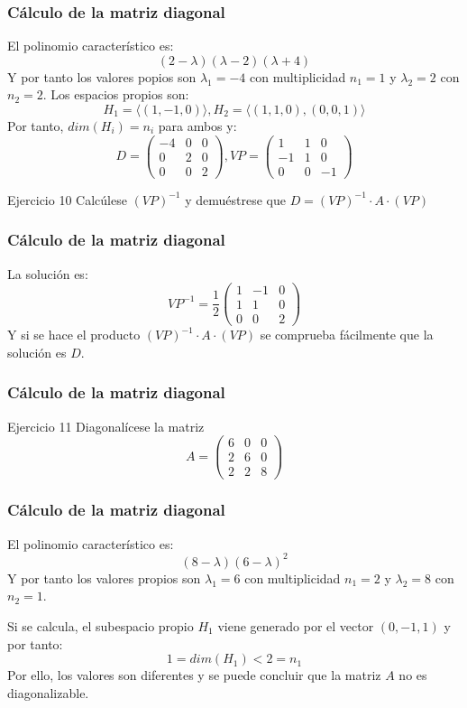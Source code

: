 \documentclass{beamer}
\begin{document}
\begin{frame}
\frametitle{C\'alculo de la matriz diagonal}
El polinomio caracter\'istico es:
\[(2-\lambda)(\lambda-2)(\lambda+4)\]
Y por tanto los valores popios son $\lambda_1 = -4$ con multiplicidad $n_1=1$ y $\lambda_2 = 2$ con $n_2 = 2$. Los espacios propios son:
\[H_1 = \langle (1,-1,0)\rangle, H_2 = \langle (1,1,0), (0,0,1)\rangle\]
Por tanto, $dim(H_i) = n_i$ para ambos y: 
\[D=\left(\begin{array}{ccc}-4 & 0 & 0 \\0 & 2 & 0 \\0 & 0 & 2\end{array}\right), VP=\left(\begin{array}{ccc}1 & 1 & 0\\-1 & 1 & 0 \\0 & 0 & -1\end{array}\right)\]
\begin{block}{Ejercicio 10}
Calc\'ulese $(VP)^{-1}$ y demu\'estrese que $D=(VP)^{-1}\cdot A\cdot (VP)$
\end{block}
\end{frame}


\begin{frame}
\frametitle{C\'alculo de la matriz diagonal}
La soluci\'on es:
\[VP^{-1}=\frac{1}{2}\left(\begin{array}{ccc}1 & -1 & 0 \\1 & 1 & 0 \\0 & 0 & 2\end{array}\right)\]
Y si se hace el producto $(VP)^{-1}\cdot A\cdot (VP)$ se comprueba f\'acilmente que la soluci\'on es $D$. 
\end{frame}


\begin{frame}
\frametitle{C\'alculo de la matriz diagonal}
\begin{block}{Ejercicio 11}
Diagonal\'icese la matriz \[A=\left(\begin{array}{ccc}6 & 0 & 0 \\2 & 6 & 0 \\2 & 2 & 8\end{array}\right)\]
\end{block}
\end{frame}




\begin{frame}
\frametitle{C\'alculo de la matriz diagonal}
El polinomio caracter\'istico es:
\[(8-\lambda)(6-\lambda)^2\]
Y por tanto los valores propios son $\lambda_1 = 6$ con multiplicidad $n_1=2$ y $\lambda_2 = 8$ con $n_2 = 1$. 

Si se calcula, el subespacio propio $H_1$ viene generado por el vector $(0,-1,1)$ y por tanto:
\[1=dim(H_1) < 2 = n_1\]
Por ello, los valores son diferentes y se puede concluir que la matriz $A$ no es diagonalizable. 
\end{frame}
\end{document}
